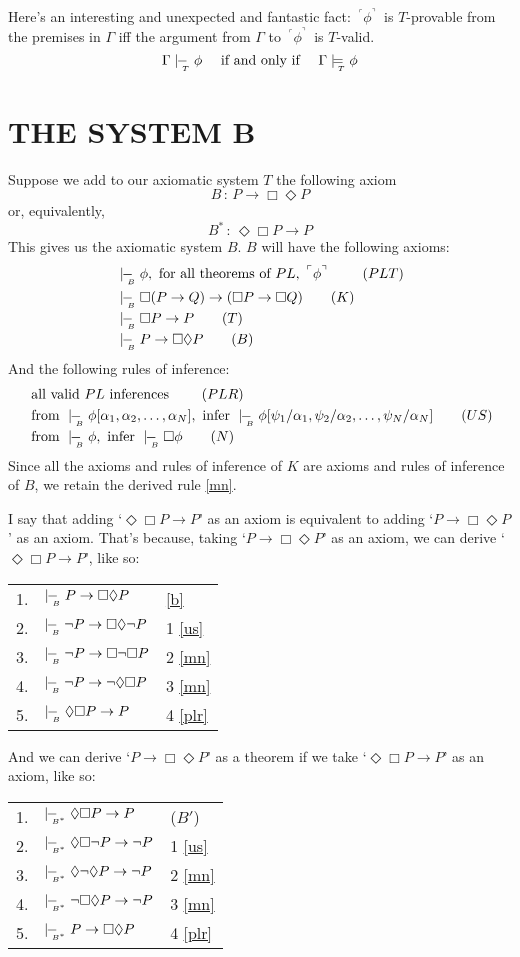 \documentclass[landscape, two column, full page,reqno]{article}
\newcommand{\p}{\item}
\newcommand{\tnot}{\neg}
\newcommand{\fns}[1]{{\footnotesize #1}}
\newcommand{\qq}[1]{ ~\!^\ulcorner #1  ^\urcorner~\!}
\newcommand{\tmodels}{\models_{\!\!\!\raisebox{-3pt}{\text{\tiny$T$}}}}
\newcommand{\tproves}{\mid\hspace{-3.9pt}-_{\!\!\!\raisebox{-3pt}{\text{\tiny$T$}}}\hspace{3pt}}
\newcommand{\bproves}{\mid\hspace{-3.9pt}-_{\!\!\!\raisebox{-3pt}{\text{\tiny$B$}}}\hspace{3pt}}
\newcommand{\bpproves}{\mid\hspace{-3.9pt}-_{\!\!\!\raisebox{-3pt}{\text{\tiny$B^*$}}}\hspace{3pt}}
\newcommand{\D}{\Diamond}
\newcommand{\B}{\Box}
\newcommand{\hs}{\hspace{2pt}}
\newcommand{\aproof}[2]{\begin{center}
\begin{tabularx}{#1}{l X l}
#2
\end{tabularx}
\end{center}}
\begin{document}
\p Here's an interesting and unexpected and fantastic fact: $\qq{\phi}$ is $T$-provable from the premises in  $\Gamma$ iff the argument from $\Gamma$ to $\qq{\phi}$ is $T$-valid.
			\[
			\Gamma \tproves \phi \quad \mbox{ if and only if } \quad \Gamma \tmodels \phi
			\]
			
\section{T\fns{HE} S\fns{YSTEM} B}
\p Suppose we add to our axiomatic system  $T$ the following axiom
	\[
	B \hs:\hs  P \to \B \D P
	\]
or, equivalently,	
	\[
	B^* \hs:\hs \D \B P \to P
	\]
This gives us the axiomatic system ${B}$.     $B$ will have the following axioms:
		\begin{align}
		& \bproves \phi, \text{ for all theorems of $PL$, $\qq{\phi}$ }			\tag{$PLT$}\label{plt}	\\
		& \bproves\B( P \to Q) \to (\B P \to \B Q)	\tag{$K$}\label{k}	\\
		& \bproves \B P \to P			\tag{$T$} \label{t}			\\
		& \bproves P \to \B \D P		\tag{$B$} \label{b}
		 \end{align}
And the following rules of inference:
		\begin{align}
		&\text{ all valid $PL$ inferences }	\tag{$PLR$}\label{plr}	\\
		&\text{ from } \bproves \phi[\alpha_1, \alpha_2, \dots, \alpha_N] , \text{ infer } \bproves \phi [\psi_1/\alpha_1, \psi_2/\alpha_2, \dots, \psi_N/\alpha_N]	\tag{$US$}\label{us}\\
		& \mbox{ from } \bproves \phi, \mbox{ infer } \bproves \B \phi \tag{$N$}\label{n}
		\end{align}
	Since all the axioms and rules of inference of $K$ are axioms and rules of inference of $B$, we retain the derived rule \eqref{mn}.
		
\p I say that adding `$\D \B P \to P$' as an axiom is equivalent to adding `$P \to \B \D P$' as an axiom.  That's because, taking `$P \to \B \D P$' as an axiom, we can derive `$\D \B P \to P$', like so: 
\aproof{200pt}{
1. & $\bproves P \to \B \D P$		& 	\eqref{b}	\\
2. & $\bproves \tnot P \to \B \D \tnot P$	& 1 \eqref{us}	\\
3. &$\bproves \tnot P \to \B \tnot \B P$	& 2 \eqref{mn}	\\
4. &$\bproves \tnot P \to \tnot \D \B P$	& 3 \eqref{mn}	\\
5. &$\bproves \D \B P \to P$			& 4 \eqref{plr}
}
And  we can derive `$P \to \B\D P$' as a theorem if we take `$\D \B P \to P$' as an axiom, like so:
	\aproof{200pt}{
	1. & $\bpproves \D \B P \to P$			& ($B'$)	\\
	2. & $\bpproves \D \B \tnot P \to \tnot P$	& 1 \eqref{us}	\\
	3. & $\bpproves \D \tnot \D P \to \tnot P$	& 2 \eqref{mn}	\\
	4. & $\bpproves \tnot \B \D P \to \tnot P$	& 3 \eqref{mn}	\\
	5. & $\bpproves P \to \B \D P$			& 4 \eqref{plr}
	}
	
\end{document}
